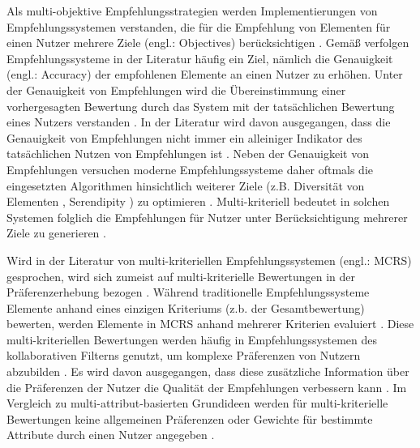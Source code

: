 Als multi-objektive Empfehlungsstrategien werden Implementierungen von Empfehlungssystemen verstanden, die für die Empfehlung von Elementen für einen Nutzer mehrere Ziele (engl.: Objectives) berücksichtigen \cite[S. 850]{adomavicius:4:inbook}.
Gemäß \textcite[S. 1097]{mcnee:inproceedings} verfolgen Empfehlungssysteme in der Literatur häufig ein Ziel, nämlich die Genauigkeit (engl.: Accuracy) der empfohlenen Elemente an einen Nutzer zu erhöhen.
Unter der Genauigkeit von Empfehlungen wird die Übereinstimmung einer vorhergesagten Bewertung durch das System mit der tatsächlichen Bewertung eines Nutzers verstanden \cite[S. 1098]{mcnee:inproceedings}.
In der Literatur wird davon ausgegangen, dass die Genauigkeit von Empfehlungen nicht immer ein alleiniger Indikator des tatsächlichen Nutzen von Empfehlungen ist \cite[S. 1097]{mcnee:inproceedings}\cite[S. 850]{adomavicius:4:inbook}\cite[S. 896]{adomavicius:article}.
Neben der Genauigkeit von Empfehlungen versuchen moderne Empfehlungssysteme daher oftmals die eingesetzten Algorithmen hinsichtlich weiterer Ziele (z.B. Diversität von Elementen \cite[S. 896]{adomavicius:article}, Serendipity \cite[S. 1099]{mcnee:inproceedings}) zu optimieren \cite[S. 850]{adomavicius:4:inbook}.
Multi-kriteriell bedeutet in solchen Systemen folglich die Empfehlungen für Nutzer unter Berücksichtigung mehrerer Ziele zu generieren \cite[S. 850]{adomavicius:4:inbook}.

Wird in der Literatur von multi-kriteriellen Empfehlungssystemen (engl.: \ac{MCRS}) gesprochen, wird sich zumeist auf multi-kriterielle Bewertungen in der Präferenzerhebung bezogen \cite[S. 207]{hdioud:inproceedings}\cite[S. 1156]{gupta:inproceedings}\cite[S. 327]{hassan:inproceedings}.
Während traditionelle Empfehlungssysteme Elemente anhand eines einzigen Kriteriums (z.b. der Gesamtbewertung) bewerten, werden Elemente in \ac{MCRS} anhand mehrerer Kriterien evaluiert \cite[S. 850]{adomavicius:4:inbook}\cite[S. 2]{adomavicius:5:inbook}.
Diese multi-kriteriellen Bewertungen werden häufig in Empfehlungssystemen des kollaborativen Filterns genutzt, um komplexe Präferenzen von Nutzern abzubilden \cite[S. 850]{adomavicius:4:inbook}.
Es wird davon ausgegangen, dass diese zusätzliche Information \cite[S. 49]{adomavicius:inproceedings:2} über die Präferenzen der Nutzer die Qualität der Empfehlungen verbessern kann \cite[S. 2]{adomavicius:5:inbook}.
Im Vergleich zu multi-attribut-basierten Grundideen werden für multi-kriterielle Bewertungen keine allgemeinen Präferenzen oder Gewichte für bestimmte Attribute durch einen Nutzer angegeben \cite[S. 851]{adomavicius:4:inbook}.

